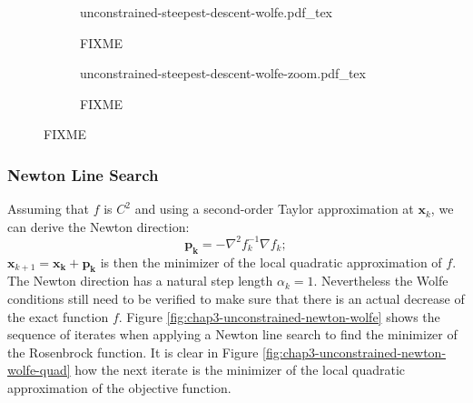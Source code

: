 \begin{figure}
  \centering
  \begin{subfigure}{0.4\columnwidth}
    \centering
        {\def\svgwidth{\linewidth}
          {\footnotesize
            
                       {unconstrained-steepest-descent-wolfe.pdf_tex}
          }
        }
        \caption{FIXME}
        \label{fig:chap3-unconstrained-steepest-descent-wolfe-a}
  \end{subfigure}
  \begin{subfigure}{0.4\columnwidth}
    \centering
        {\def\svgwidth{\linewidth}
          {\footnotesize
            
                       {unconstrained-steepest-descent-wolfe-zoom.pdf_tex}
          }
        }
        \caption{FIXME}
        \label{fig:chap3-unconstrained-steepest-descent-wolfe-b}
  \end{subfigure}
  \caption{FIXME}
  \label{fig:chap3-unconstrained-steepest-descent-wolfe}
\end{figure}

\subsubsection{Newton Line Search}

Assuming that $f$ is $C^2$ and using a second-order Taylor
approximation at $\mathbf{x}_k$, we can derive the Newton direction:
\begin{equation}
\mathbf{p_k} = -\nabla^2 f_k^{-1} \nabla f_k;
\end{equation}
$\mathbf{x}_{k+1}=\mathbf{x_k}+\mathbf{p_k}$ is then the minimizer of
the local quadratic approximation of $f$. The Newton direction has a
natural step length $\alpha_k=1$. Nevertheless the Wolfe conditions
still need to be verified to make sure that there is an actual
decrease of the exact function $f$. Figure
\ref{fig:chap3-unconstrained-newton-wolfe} shows the sequence of
iterates when applying a Newton line search to find the minimizer of
the Rosenbrock function. It is clear in Figure
\ref{fig:chap3-unconstrained-newton-wolfe-quad} how the next iterate
is the minimizer of the local quadratic approximation of the objective
function.

